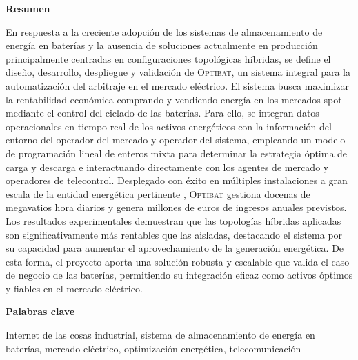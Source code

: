 \newpage

\thispagestyle{empty}

\begin{center}
  {\bf \huge Resumen}
\end{center}

\vspace{1cm}

En respuesta a la creciente adopción de los sistemas de almacenamiento de energía en baterías y la ausencia de soluciones actualmente en producción principalmente centradas en configuraciones topológicas híbridas, se define el diseño, desarrollo, despliegue y validación de \textsc{Optibat}, un sistema integral para la automatización del arbitraje en el mercado eléctrico. El sistema busca maximizar la rentabilidad económica comprando y vendiendo energía en los mercados spot mediante el control del ciclado de las baterías. Para ello, se integran datos operacionales en tiempo real de los activos energéticos con la información del entorno del operador del mercado y operador del sistema, empleando un modelo de programación lineal de enteros mixta para determinar la estrategia óptima de carga y descarga e interactuando directamente con los agentes de mercado y operadores de telecontrol. Desplegado con éxito en múltiples instalaciones a gran escala de la entidad energética pertinente , \textsc{Optibat} gestiona docenas de megavatios hora diarios y genera millones de euros de ingresos anuales previstos. Los resultados experimentales demuestran que las topologías híbridas aplicadas son significativamente más rentables que las aisladas, destacando el sistema por su capacidad para aumentar el aprovechamiento de la generación energética. De esta forma, el proyecto aporta una solución robusta y escalable que valida el caso de negocio de las baterías, permitiendo su integración eficaz como activos óptimos y fiables en el mercado eléctrico.

\vspace{1cm}

\begin{center}
  {\bf \large Palabras clave}
\end{center}

\vspace{0.5cm}

Internet de las cosas industrial, sistema de almacenamiento de energía en baterías, mercado eléctrico, optimización energética, telecomunicación

\newpage

\thispagestyle{empty}

